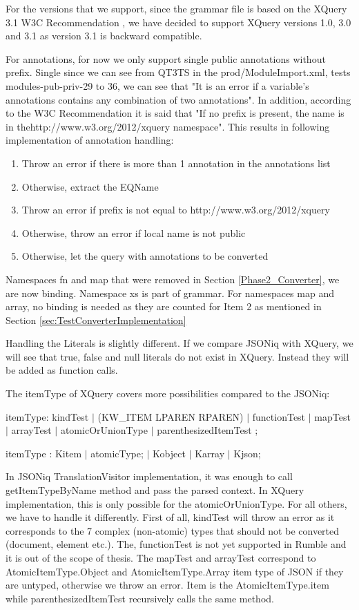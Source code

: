 For the versions that we support, since the grammar file is based on the XQuery 3.1 W3C Recommendation \cite{XQueryRecommendation}, we have decided to support XQuery versions 1.0, 3.0 and 3.1 as version  3.1 is backward compatible.

For annotations, for now we only support single public annotations without prefix. Single since we can see from QT3TS in the prod/ModuleImport.xml, tests modules-pub-priv-29 to 36, we can see that "It is an error if a variable's annotations contains any combination of two annotations". In addition, according to the W3C Recommendation \cite{XQueryRecommendation} it is said that "If no prefix is present, the name is in thehttp://www.w3.org/2012/xquery namespace". This results in following implementation of annotation handling:
\begin{enumerate}
	\item Throw an error if there is more than 1 annotation in the annotations list
	\item Otherwise, extract the EQName
	\item Throw an error if prefix is not equal to http://www.w3.org/2012/xquery 
	\item Otherwise, throw an error if local name is not public
	\item Otherwise, let the query with annotations to be converted
\end{enumerate}

Namespaces fn and map that were removed in Section \ref{Phase2_Converter}, we are now binding. Namespace xs is part of grammar. For namespaces map and array, no binding is needed as they are counted for Item 2 as mentioned in Section \ref{sec:TestConverterImplementation}

Handling the Literals is slightly different. If we compare JSONiq with XQuery, we will see that true, false and null literals do not exist in XQuery. Instead they will be added as function calls.

The itemType of XQuery covers more possibilities compared to the JSONiq:

itemType: kindTest
$|$ (KW\_ITEM LPAREN RPAREN)
$|$ functionTest
$|$ mapTest
$|$ arrayTest
$|$ atomicOrUnionType
$|$ parenthesizedItemTest ;

itemType                : Kitem
$|$ atomicType;
$|$ Kobject
$|$ Karray
$|$ Kjson;

In JSONiq TranslationVisitor implementation, it was enough to call getItemTypeByName method and pass the parsed context. In XQuery implementation, this is only possible for the atomicOrUnionType. For all others, we have to handle it differently. First of all, kindTest will throw an error as it corresponds to the 7 complex (non-atomic) types that should not be converted (document, element etc.). The, functionTest is not yet supported in Rumble and it is out of the scope of thesis. The mapTest and arrayTest correspond to AtomicItemType.Object and AtomicItemType.Array item type of JSON if they are untyped, otherwise we throw an error. Item is the AtomicItemType.item while parenthesizedItemTest recursively calls the same method.


